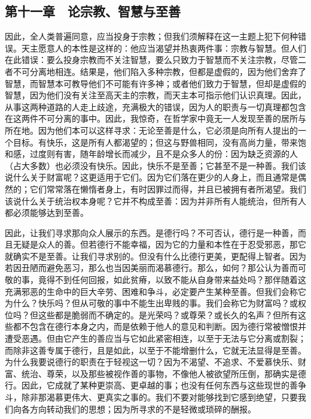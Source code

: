 \subsection{第十一章　论宗教、智慧与至善}

因此，全人类普遍同意，应当投身于宗教；但我们须解释在这一主题上犯下何种错误。天主愿意人的本性是这样的：他应当渴望并热衷两件事：宗教与智慧。但人们在此错误：要么投身宗教而不关注智慧，要么只致力于智慧而不关注宗教，尽管二者不可分离地相连。结果是，他们陷入多种宗教，但都是虚假的，因为他们舍弃了智慧，而智慧本可教导他们不可能有许多神；或者他们致力于智慧，但却是虚假的智慧，因为他们没有关注至高天主的宗教，而天主本可指示他们认识真理。因此，从事这两种道路的人走上歧途，充满极大的错误，因为人的职责与一切真理都包含在这两件不可分离的事中。因此，我惊奇，在哲学家中竟无一人发现至善的居所与所在地。因为他们本可以这样寻求：无论至善是什么，它必须是向所有人提出的一个目标。有快乐，这是所有人都渴望的；但这与野兽相同，没有高尚力量，带来饱和感，过度则有害，随年龄增长而减少，且不是众多人的份：因为缺乏资源的人（占大多数）也必须没有快乐。因此，快乐不是至善；它甚至不是一种善。我们该说什么关于财富呢？这更适用于它们。因为它们落在更少的人身上，而且通常是偶然的；它们常常落在懒惰者身上，有时因罪过而得，并且已被拥有者所渴望。我们该说什么关于统治权本身呢？它并不构成至善：因为并非所有人能统治，但所有人都必须能够达到至善。\par

因此，让我们寻求那向众人展示的东西。是德行吗？不可否认，德行是一种善，而且无疑是众人的善。但若德行不能幸福，因为它的力量和本性在于忍受邪恶，那它就确实不是至善。让我们寻求别的。但没有什么比德行更美，更配得上智者。因为若因丑陋而避免恶习，那么也当因美丽而渴慕德行。那么，如何？那公认为善而可敬的事，竟得不到任何回报，如此贫瘠，以致不能从自身带来益处吗？那伴随着这充满邪恶的生命中的巨大辛劳、困难和争斗，必定要产生某种至善。但我们会称它为什么？快乐吗？但从可敬的事中不能生出卑贱的事。我们会称它为财富吗？或权位吗？但这些都是脆弱而不确定的。是光荣吗？或尊荣？或长久的名声？但所有这些都不包含在德行本身之内，而是依赖于他人的意见和判断。因为德行常被憎恨并遭受恶遇。但由它产生的善应当与它如此紧密相连，以至于无法与它分离或割裂；而除非这善专属于德行，且是如此，以至于不能增删什么，它就无法显得是至善。为什么我要说德行的职责在于轻视这一切？因为不渴望、不追求、不爱慕快乐、财富、统治、尊荣，以及那些被视作善的事物，不像他人被欲望所压倒，那确实是德行。因此，它成就了某种更崇高、更卓越的事；也没有任何东西与这些现世的善争斗，除非那渴慕更伟大、更真实之事的。我们不要对能够找到它感到绝望，只要我们向各方向转动我们的思想；因为所寻求的不是轻微或琐碎的酬报。\par

